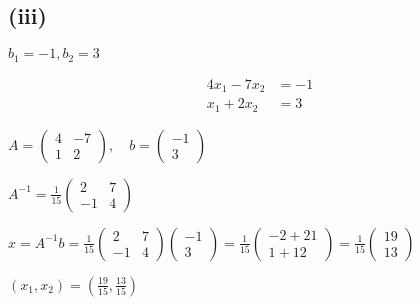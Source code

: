 \subsection*{(iii)} $b_1 = -1, b_2 = 3$

\begin{align}
	4x_1 - 7x_2 & = -1 \\
	x_1 + 2x_2  & = 3
\end{align}

$A = \begin{pmatrix}
	4 & -7 \\
	1 & 2
\end{pmatrix}, \quad b = \begin{pmatrix}
	-1 \\
	3
\end{pmatrix}$

$A^{-1} = \frac{1}{15}\begin{pmatrix}
	2 & 7 \\
	-1 & 4
\end{pmatrix}$

$x = A^{-1}b = \frac{1}{15}\begin{pmatrix}
	2 & 7 \\
	-1 & 4
\end{pmatrix}\begin{pmatrix}
	-1 \\
	3
\end{pmatrix} = \frac{1}{15}\begin{pmatrix}
	-2 + 21 \\
	1 + 12
\end{pmatrix} = \frac{1}{15}\begin{pmatrix}
	19 \\
	13
\end{pmatrix}$

$\boxed{(x_1, x_2) = \left(\frac{19}{15}, \frac{13}{15}\right)}$